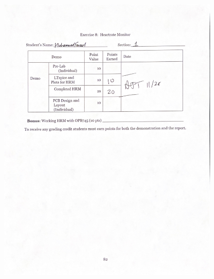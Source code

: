 \documentclass[CMPE]{KGCOEReport}
\begin{document}
\newpage
\begin{figure}[H]
    \centering
    \begin{adjustbox}{center}
        \includegraphics[width=1.26\textwidth]{signoff_2.pdf}
    \end{adjustbox}
\end{figure}
\end{document}
